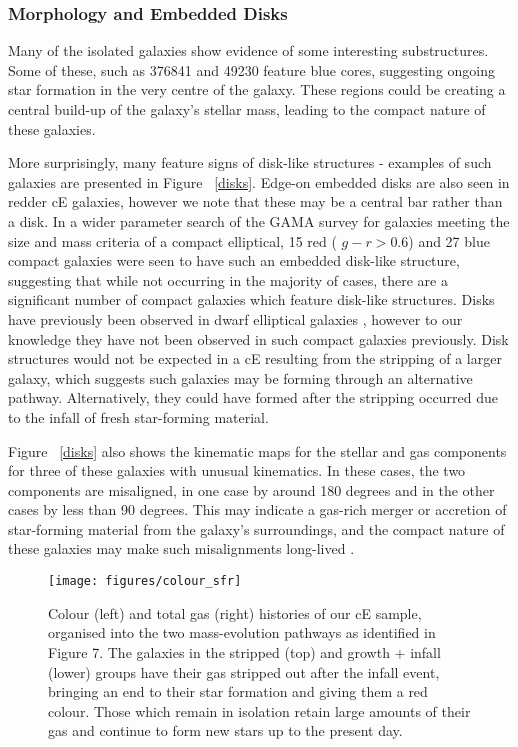 \documentclass[a4paper,fleqn,usenatbib]{mnras}
\begin{document}
\subsubsection{Morphology and Embedded Disks}




Many of the isolated galaxies show evidence of some interesting substructures. Some of these, such as 376841 and 49230 feature blue cores, suggesting ongoing star formation in the very centre of the galaxy. These regions could be creating a central build-up of the galaxy's stellar mass, leading to the compact nature of these galaxies. 

More surprisingly, many feature signs of disk-like structures - examples of such galaxies are presented in Figure ~\ref{disks}. Edge-on embedded disks are also seen in redder cE galaxies, however we note that these may be a central bar rather than a disk. In a wider parameter search of the GAMA survey for galaxies meeting the size and mass criteria of a compact elliptical, 15 red ( $g-r > 0.6$) and 27 blue compact galaxies were seen to have such an embedded disk-like structure, suggesting that while not occurring in the majority of cases, there are a significant number of compact galaxies which feature disk-like structures. Disks have previously been observed in dwarf elliptical galaxies \citep{2003A&A...400..119D}, however to our knowledge they have not been observed in such compact galaxies previously. Disk structures would not be expected in a cE resulting from the stripping of a larger galaxy, which suggests such galaxies may be forming through an alternative pathway. Alternatively, they could have formed after the stripping occurred due to the infall of fresh star-forming material. 

Figure ~\ref{disks} also shows the kinematic maps for the stellar and gas components for three of these galaxies with unusual kinematics. In these cases, the two components are misaligned, in one case by around 180 degrees and in the other cases by less than 90 degrees. This may indicate a gas-rich merger or accretion of star-forming material from the galaxy's surroundings, and the compact nature of these galaxies may make such misalignments long-lived \citep{2022MNRAS.517.2677R}.
 


\begin{figure*}
\texttt{[image: figures/colour\_sfr]}
   \caption{Colour (left) and total gas (right) histories of our cE sample, organised into the two mass-evolution pathways as identified in Figure 7. The galaxies in the stripped (top) and growth + infall (lower) groups have their gas stripped out after the infall event, bringing an end to their star formation and giving them a red colour. Those which remain in isolation retain large amounts of their gas and continue to form new stars up to the present day.}
 \label{hist_colour}
 \end{figure*}
\end{document}
